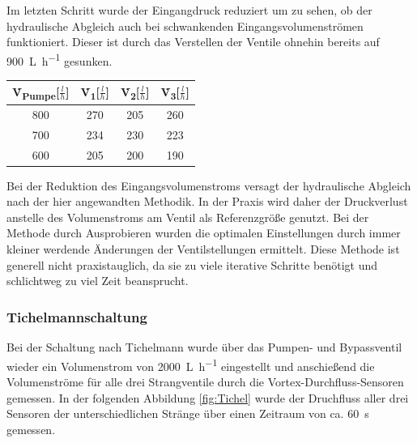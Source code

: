 Im letzten Schritt wurde der Eingangdruck reduziert um zu sehen, ob der hydraulische Abgleich auch bei schwankenden Eingangsvolumenströmen funktioniert. Dieser ist durch das Verstellen der Ventile ohnehin bereits auf \SI{900}{\liter\per\hour} gesunken.

\begin{center}
	\begin{tabular}{c|c|c|c}
		\label{tab:komp2}
		
		\textbf{\.V\textsubscript{Pumpe}}[$\frac{l}{h}$] & \textbf{\.V\textsubscript{1}}[$\frac{l}{h}$] & \textbf{\.V\textsubscript{2}}[$\frac{l}{h}$] & \textbf{\.V\textsubscript{3}}[$\frac{l}{h}$]\\
		\hline
		800 & 270 & 205 & 260\\
		700 & 234 & 230 & 223\\
		600 & 205 & 200 & 190\\
	\end{tabular}
\end{center}

Bei der Reduktion des Eingangsvolumenstroms versagt der hydraulische Abgleich nach der hier angewandten Methodik. In der Praxis wird daher der Druckverlust anstelle des Volumenstroms am Ventil als Referenzgröße genutzt. Bei der Methode durch Ausprobieren wurden die optimalen Einstellungen durch immer kleiner werdende Änderungen der Ventilstellungen ermittelt. Diese Methode ist generell nicht praxistauglich, da sie zu viele iterative Schritte benötigt und schlichtweg zu viel Zeit beansprucht.

\subsubsection{Tichelmannschaltung}

Bei der Schaltung nach Tichelmann wurde über das Pumpen- und Bypassventil wieder ein Volumenstrom von \SI{2000}{\liter\per\hour} eingestellt und anschießend die Volumenströme für alle drei Strangventile durch die Vortex-Durchfluss-Sensoren gemessen. In der folgenden Abbildung \ref{fig:Tichel} wurde der Druchfluss aller drei Sensoren der unterschiedlichen Stränge über einen Zeitraum von ca. \SI{60}{\second} gemessen.

